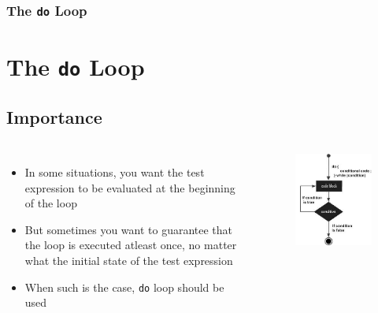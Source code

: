 \documentclass{beamer}
\begin{document}
\begin{frame}
    \frametitle{The \texttt{do} Loop}
    \section{The \texttt{do} Loop} %
    \label{sec:the_do_loop}
    \subsection{Importance} %
    \begin{columns}
        \begin{itemize}
            \item In some situations, you want the test expression to be evaluated at the beginning of the loop
            \item But sometimes you want to guarantee that the loop is executed atleast once, no matter what the initial state of the test expression
            \item When such is the case, \texttt{do} loop should be used
        \end{itemize}
        \begin{figure}
            \centering
            \includegraphics[scale=0.45]{do}
        \end{figure}
    \end{columns}
\end{frame}
\end{document}
